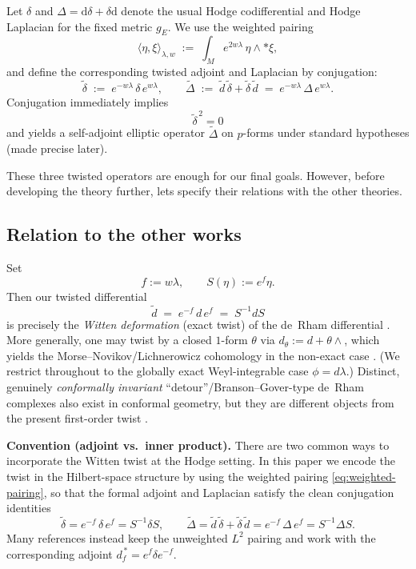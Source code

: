 \documentclass[preprint,12pt]{elsarticle}
\theoremstyle{plain}
\theoremstyle{definition}
\theoremstyle{note}
\newcommand{\dd}{\mathrm{d}}
\newcommand{\wtd}{\tilde d}
\newcommand{\wtdel}{\tilde\delta}
\newcommand{\wtD}{\tilde\Delta}
\begin{document}
Let $\delta$ and $\Delta=\dd\delta+\delta\dd$ denote the usual Hodge codifferential and Hodge Laplacian for the fixed metric $g_E$. We use the weighted pairing
\begin{equation}\label{eq:weighted-pairing}
\langle \eta,\xi\rangle_{\lambda,w} \;:=\; \int_M e^{2w\lambda}\,\eta\wedge *\xi,
\end{equation}
and define the corresponding twisted adjoint and Laplacian by conjugation:
\begin{equation}\label{eq:tilde-delta-tilde-Delta}
\wtdel \;:=\; e^{-w\lambda}\,\delta\,e^{w\lambda},
\qquad
\wtD \;:=\; \wtd\,\wtdel+\wtdel\,\wtd
\;=\; e^{-w\lambda}\,\Delta\,e^{w\lambda}.
\end{equation}
Conjugation immediately implies 
\begin{equation}\label{eq:nilp_delta}
\boxed{
\wtdel^{\,2}=0}
\end{equation}
and yields a self-adjoint elliptic operator $\tilde\Delta$ on $p$-forms under standard hypotheses (made precise later).

These three twisted operators are enough for our final goals. However, before developing the theory further, lets specify their relations with the other theories. 

\subsection{Relation to the other works}

Set
\[
f := w\lambda,\qquad S(\eta):=e^{f}\eta .
\]
Then our twisted differential
\[
\tilde d \;=\; e^{-f}\, d\, e^{f} \;=\; S^{-1} d S
\]
is precisely the \emph{Witten deformation} (exact twist) of the de~Rham differential \cite{Witten1982}.
More generally, one may twist by a closed $1$-form $\theta$ via $d_\theta:=d+\theta\wedge$, which yields the
Morse--Novikov/Lichnerowicz cohomology in the non-exact case \cite{Novikov1981,Farber2004}.
(We restrict throughout to the globally exact Weyl-integrable case $\phi=d\lambda$.)  Distinct, genuinely
\emph{conformally invariant} ``detour''/Branson--Gover-type de~Rham complexes also exist in conformal geometry,
but they are different objects from the present first-order twist \cite{BransonGover2003,Gover2005}.

\medskip
\noindent\textbf{Convention (adjoint vs.\ inner product).} There are two common ways to incorporate the Witten twist at the Hodge setting. In this paper we encode the twist in the Hilbert-space structure by using the weighted pairing \eqref{eq:weighted-pairing}, so that the formal adjoint and Laplacian satisfy the clean conjugation identities
\[
\tilde\delta = e^{-f}\,\delta\,e^{f}=S^{-1}\delta S,
\qquad
\tilde\Delta=\tilde d\,\tilde\delta+\tilde\delta\,\tilde d
= e^{-f}\,\Delta\,e^{f}=S^{-1}\Delta S .
\]
Many references instead keep the unweighted $L^2$ pairing and work with the corresponding adjoint
$d_f^{\,*}=e^{f}\delta e^{-f}$.
\end{document}
